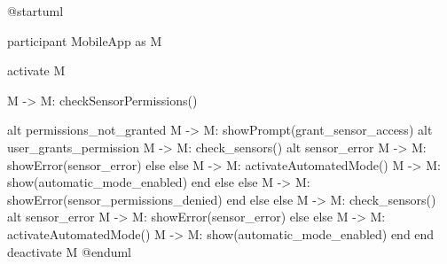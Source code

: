 @startuml

participant MobileApp as M

activate M

M -> M: checkSensorPermissions()

alt permissions_not_granted
M -> M: showPrompt(grant_sensor_access)
alt user_grants_permission
M -> M: check_sensors()
alt sensor_error
M -> M: showError(sensor_error)
else else
M -> M: activateAutomatedMode()
M -> M: show(automatic_mode_enabled)
end
else else 
M -> M: showError(sensor_permissions_denied)
end
else else 
M -> M: check_sensors()
alt sensor_error
M -> M: showError(sensor_error)
else else
M -> M: activateAutomatedMode()
M -> M: show(automatic_mode_enabled)
end
end
deactivate M
@enduml